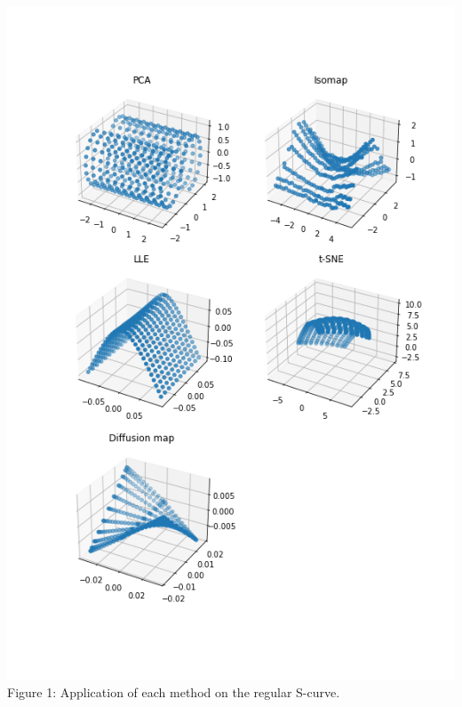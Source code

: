 \documentclass{letter}
\begin{document}
{    \begin{center}
        \includegraphics[scale=0.9, trim={2cm 2.5cm 1.5cm 3cm}, clip]{../pics/3d_scurve.png} \\
        Figure 1: Application of each method on the regular S-curve.
    \end{center}}
\end{document}
